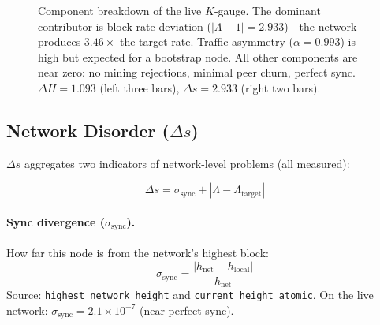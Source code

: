 \documentclass[11pt,a4paper]{article}
\begin{document}
\begin{figure}[H]
\centering
{}
\caption{Component breakdown of the live $K$-gauge. The dominant contributor is block rate deviation ($|\Lambda - 1| = 2.933$)---the network produces $3.46\times$ the target rate. Traffic asymmetry ($\alpha = 0.993$) is high but expected for a bootstrap node. All other components are near zero: no mining rejections, minimal peer churn, perfect sync. $\Delta H = 1.093$ (left three bars), $\Delta s = 2.933$ (right two bars).}
\label{fig:kgauge_breakdown}
\end{figure}

\subsection{Network Disorder ($\Delta s$)}

$\Delta s$ aggregates two indicators of network-level problems (\textcolor{measured}{all measured}):

\begin{equation}
\Delta s = \sigma_{\text{sync}} + |\Lambda - \Lambda_{\text{target}}|
\end{equation}

\paragraph{Sync divergence ($\sigma_{\text{sync}}$).} How far this node is from the network's highest block:
\[
\sigma_{\text{sync}} = \frac{|h_{\text{net}} - h_{\text{local}}|}{h_{\text{net}}}
\]
Source: \texttt{highest\_network\_height} and \texttt{current\_height\_atomic}. On the live network: $\sigma_{\text{sync}} = 2.1 \times 10^{-7}$ (near-perfect sync).
\end{document}
